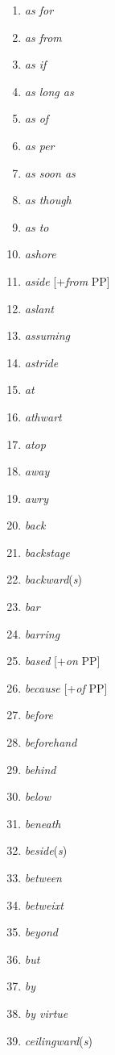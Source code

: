 \begin{multicols}{3}
\begin{enumerate}[noitemsep]
    \item \textit{as for}
    \item \textit{as from}
    \item \textit{as if}
    \item \textit{as long as}
    \item \textit{as of}
    \item \textit{as per}
    \item \textit{as soon as}
    \item \textit{as though}
    \item \textit{as to}
    \item \textit{ashore}
    \item \textit{aside} [+\textit{from} PP]
    \item \textit{aslant}
    \item \textit{assuming}
    \item \textit{astride}
    \item \textit{at}
    \item \textit{athwart}
    \item \textit{atop}
    \item \textit{away}
    \item \textit{awry}
    \item \textit{back}
    \item \textit{backstage}
    \item \textit{backward}(\textit{s})
    \item \textit{bar}
    \item \textit{barring}
    \item \textit{based} [+\textit{on} PP]
    \item \textit{because} [+\textit{of} PP]
    \item \textit{before}
    \item \textit{beforehand}
    \item \textit{behind}
    \item \textit{below}
    \item \textit{beneath}
    \item \textit{beside}(\textit{s})
    \item \textit{between}
    \item \textit{betweixt}
    \item \textit{beyond}
    \item \textit{but}
    \item \textit{by}
    \item \textit{by virtue}
    \item \textit{ceilingward}(\textit{s})

\end{enumerate}
\end{multicols}
